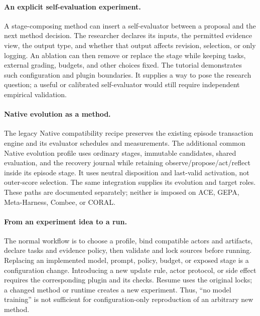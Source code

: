\paragraph{An explicit self-evaluation experiment.}
A stage-composing method can insert a self-evaluator between a proposal and the next method decision. The researcher declares its inputs, the permitted evidence view, the output type, and whether that output affects revision, selection, or only logging. An ablation can then remove or replace the stage while keeping tasks, external grading, budgets, and other choices fixed. The tutorial demonstrates such configuration and plugin boundaries. It supplies a way to pose the research question; a useful or calibrated self-evaluator would still require independent empirical validation.

\paragraph{Native evolution as a method.}
The legacy Native compatibility recipe preserves the existing episode transaction engine and its evaluator schedules and measurements. The additional common Native evolution profile uses ordinary stages, immutable candidates, shared evaluation, and the recovery journal while retaining observe/propose/act/reflect inside its episode stage. It uses neutral disposition and last-valid activation, not outer-score selection. The same integration supplies its evolution and target roles. These paths are documented separately; neither is imposed on ACE, GEPA, Meta-Harness, Combee, or CORAL.

\paragraph{From an experiment idea to a run.}
The normal workflow is to choose a profile, bind compatible actors and artifacts, declare tasks and evidence policy, then validate and lock sources before running. Replacing an implemented model, prompt, policy, budget, or exposed stage is a configuration change. Introducing a new update rule, actor protocol, or side effect requires the corresponding plugin and its checks. Resume uses the original locks; a changed method or runtime creates a new experiment. Thus, ``no model training'' is not sufficient for configuration-only reproduction of an arbitrary new method.

